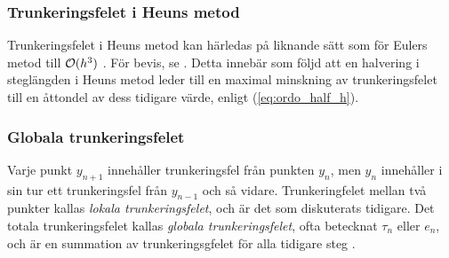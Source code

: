 \subsubsection{Trunkeringsfelet i Heuns metod}
Trunkeringsfelet i Heuns metod kan härledas på liknande sätt som för Eulers metod till \(\mathcal{O}(h^3)\) \parencite[372]{zill_differential_2005}. För bevis, se \textcite[113-114]{atkinson_numerical_2009}. Detta innebär som följd att en halvering i steglängden i Heuns metod leder till en maximal minskning av trunkeringsfelet till en åttondel av dess tidigare värde, enligt (\ref{eq:ordo_half_h}).

\subsubsection{Globala trunkeringsfelet}
Varje punkt \(y_{n+1}\) innehåller trunkeringsfel från punkten \(y_n\), men \(y_n\) innehåller i sin tur ett trunkeringsfel från \(y_{n-1}\) och så vidare. Trunkeringfelet mellan två punkter kallas \emph{lokala trunkeringsfelet}, och är det som diskuterats tidigare. Det totala trunkeringsfelet kallas \emph{globala trunkeringsfelet}, ofta betecknat \(\tau_n\) eller \(e_n\), och är en summation av trunkeringsgfelet för alla tidigare steg \parencite[370]{zill_differential_2005}.

